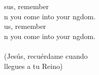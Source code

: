 \begin{cancion}%
	sus, remember \\
	n you come into your ngdom.\\
	us, remember \\
	n you come into your ngdom.\\
	\jump\\
(Jesús, recuérdame cuando \\
 llegues a tu Reino)\\
\end{cancion}%
